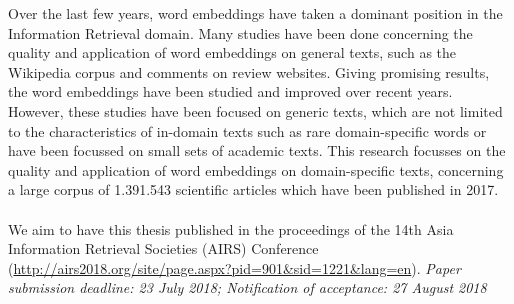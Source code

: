 \documentclass[../../Thesis.tex]{subfiles}
\begin{document}
Over the last few years, word embeddings have taken a dominant position in the Information Retrieval domain. Many studies have been done concerning the quality and application of word embeddings on general texts, such as the Wikipedia corpus and comments on review websites. Giving promising results, the word embeddings have been studied and improved over recent years. However, these studies have been focused on generic texts, which are not limited to the characteristics of in-domain texts such as rare domain-specific words or have been focussed on small sets of academic texts. This research focusses on the quality and application of word embeddings on domain-specific texts, concerning a large corpus of 1.391.543 scientific articles which have been published in 2017.\\
\vspace*{\fill}
\\
We aim to have this thesis published in the proceedings of the 14th Asia Information Retrieval Societies (AIRS) Conference (\url{http://airs2018.org/site/page.aspx?pid=901&sid=1221&lang=en}). \textit{Paper submission deadline: 23 July 2018; Notification of acceptance: 27 August 2018}
\end{document}
